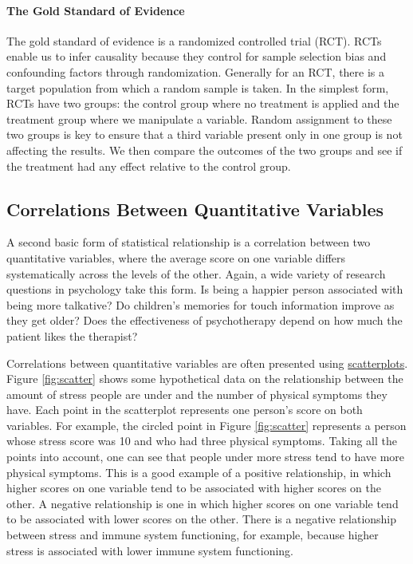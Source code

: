 \documentclass[
]{krantz}
\begin{document}
\paragraph*{The Gold Standard of Evidence}\label{the-gold-standard-of-evidence}

The gold standard of evidence is a randomized controlled trial (RCT). RCTs enable us to infer causality because they control for sample selection bias and confounding factors through randomization. Generally for an RCT, there is a target population from which a random sample is taken. In the simplest form, RCTs have two groups: the control group where no treatment is applied and the treatment group where we manipulate a variable. Random assignment to these two groups is key to ensure that a third variable present only in one group is not affecting the results. We then compare the outcomes of the two groups and see if the treatment had any effect relative to the control group.

\subsection*{Correlations Between Quantitative Variables}\label{correlations-between-quantitative-variables}


A second basic form of statistical relationship is a correlation between two quantitative variables, where the average score on one variable differs systematically across the levels of the other. Again, a wide variety of research questions in psychology take this form. Is being a happier person associated with being more talkative? Do children's memories for touch information improve as they get older? Does the effectiveness of psychotherapy depend on how much the patient likes the therapist?

Correlations between quantitative variables are often presented using \hyperref[scatterplot]{scatterplots}. Figure \ref{fig:scatter} shows some hypothetical data on the relationship between the amount of stress people are under and the number of physical symptoms they have. Each point in the scatterplot represents one person's score on both variables. For example, the circled point in Figure \ref{fig:scatter} represents a person whose stress score was 10 and who had three physical symptoms. Taking all the points into account, one can see that people under more stress tend to have more physical symptoms. This is a good example of a positive relationship, in which higher scores on one variable tend to be associated with higher scores on the other. A negative relationship is one in which higher scores on one variable tend to be associated with lower scores on the other. There is a negative relationship between stress and immune system functioning, for example, because higher stress is associated with lower immune system functioning.
\end{document}
